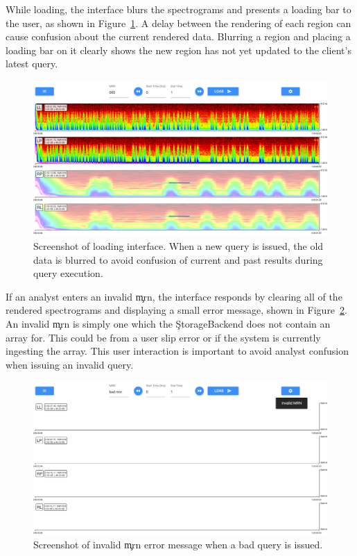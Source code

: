 While loading, the interface blurs the spectrograms and presents a loading bar
to the user, as shown in Figure~\ref{fig:loading}. A delay between the
rendering of each region can cause confusion about the current rendered data.
Blurring a region and placing a loading bar on it clearly shows the new region
has not yet updated to the client's latest query. \\

\begin{figure}[h]
\begin{center}
\includegraphics[scale=0.35]{./img/loading.png}
\caption{Screenshot of loading interface. When a new query is issued, the old
  data is blurred to avoid confusion of current and past results during query
  execution.}
\label{fig:loading}
\end{center}
\end{figure}

If an analyst enters an invalid \c{mrn}, the interface responds by clearing all
of the rendered spectrograms and displaying a small error message, shown in
Figure~\ref{fig:error}. An invalid \c{mrn} is simply one which the
\c{StorageBackend} does not contain an array for. This could be from a user slip
error or if the system is currently ingesting the array. This user interaction
is important to avoid analyst confusion when issuing an invalid query. \\

\begin{figure}[h]
\begin{center}
\includegraphics[scale=0.35]{./img/error.png}
\caption{Screenshot of invalid \c{mrn} error message when a bad query is
  issued.}
\label{fig:error}
\end{center}
\end{figure}

